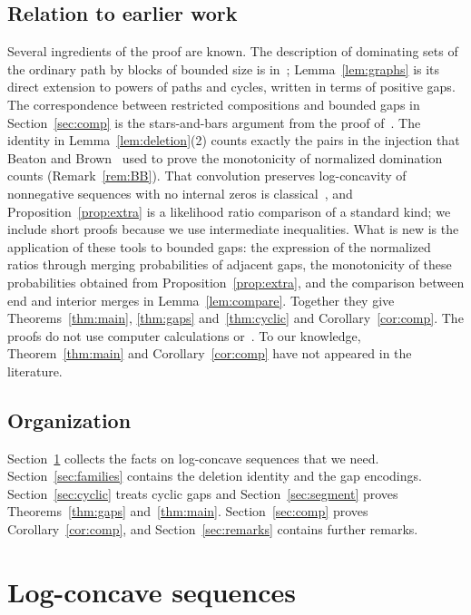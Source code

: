 \documentclass{amsart}
\theoremstyle{definition}
\theoremstyle{remark}
\numberwithin{equation}{section}
\begin{document}
\subsection*{Relation to earlier work}
Several ingredients of the proof are known. The description of dominating sets of the ordinary path by blocks of bounded size is in~\cite[Section~5.1.3]{Z}; Lemma~\ref{lem:graphs} is its direct extension to powers of paths and cycles, written in terms of positive gaps. The correspondence between restricted compositions and bounded gaps in Section~\ref{sec:comp} is the stars-and-bars argument from the proof of~\cite[Theorem~5.1.8]{Z}. The identity in Lemma~\ref{lem:deletion}(2) counts exactly the pairs in the injection that Beaton and Brown~\cite{BB} used to prove the monotonicity of normalized domination counts (Remark~\ref{rem:BB}). That convolution preserves log-concavity of nonnegative sequences with no internal zeros is classical~\cite{Br, Ho, St}, and Proposition~\ref{prop:extra} is a likelihood ratio comparison of a standard kind; we include short proofs because we use intermediate inequalities. What is new is the application of these tools to bounded gaps: the expression of the normalized ratios through merging probabilities of adjacent gaps, the monotonicity of these probabilities obtained from Proposition~\ref{prop:extra}, and the comparison between end and interior merges in Lemma~\ref{lem:compare}. Together they give Theorems~\ref{thm:main}, \ref{thm:gaps} and~\ref{thm:cyclic} and Corollary~\ref{cor:comp}. The proofs do not use computer calculations or~\cite[Theorem~1.4]{GZ}. To our knowledge, Theorem~\ref{thm:main} and Corollary~\ref{cor:comp} have not appeared in the literature.

\subsection*{Organization}
Section~\ref{sec:lc} collects the facts on log-concave sequences that we need. Section~\ref{sec:families} contains the deletion identity and the gap encodings. Section~\ref{sec:cyclic} treats cyclic gaps and Section~\ref{sec:segment} proves Theorems~\ref{thm:gaps} and~\ref{thm:main}. Section~\ref{sec:comp} proves Corollary~\ref{cor:comp}, and Section~\ref{sec:remarks} contains further remarks.

\section{Log-concave sequences}\label{sec:lc}
\end{document}
